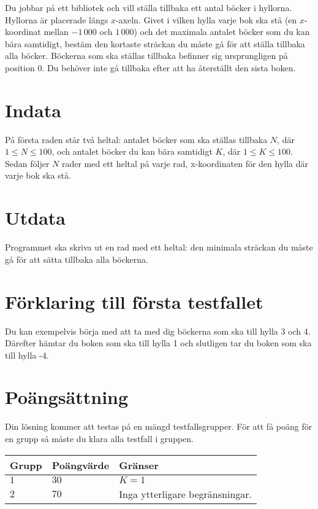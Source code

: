 Du jobbar på ett bibliotek och vill ställa tillbaka ett antal böcker i hyllorna.
Hyllorna är placerade längs $x$-axeln.
Givet i vilken hylla varje bok ska stå (en $x$-koordinat mellan $-1\,000$ och $1\,000$) och det maximala antalet böcker som du kan bära samtidigt, bestäm den kortaste sträckan du måste gå för att ställa tillbaka alla böcker.
Böckerna som ska ställas tillbaka befinner sig ursprungligen på position $0$.
Du behöver inte gå tillbaka efter att ha återställt den sista boken. 

\section*{Indata}
På första raden står två heltal: antalet böcker som ska ställas tillbaka $N$, där $1 \le N \le 100$, och antalet böcker du kan bära samtidigt $K$, där $1 \le K \le 100$. Sedan följer $N$ rader med ett heltal på varje rad, x-koordinaten för den hylla där varje bok ska stå. 

\section*{Utdata}
Programmet ska skriva ut en rad med ett heltal: den minimala sträckan du måste gå för att sätta tillbaka alla böckerna. 

\section*{Förklaring till första testfallet}
Du kan exempelvis börja med att ta med dig böckerna som ska till hylla 3 och 4. Därefter hämtar du boken som ska till hylla 1 och slutligen tar du boken som ska till hylla -4. 

\section*{Poängsättning}
Din lösning kommer att testas på en mängd testfallsgrupper.
För att få poäng för en grupp så måste du klara alla testfall i gruppen.

\noindent
\begin{tabular}{| l | l | p{12cm} |}
  \hline
  Grupp & Poängvärde & Gränser \\ \hline
  $1$    & $30$        & $K = 1$ \\ \hline 
  $2$    & $70$        & Inga ytterligare begränsningar. \\ \hline
\end{tabular}
